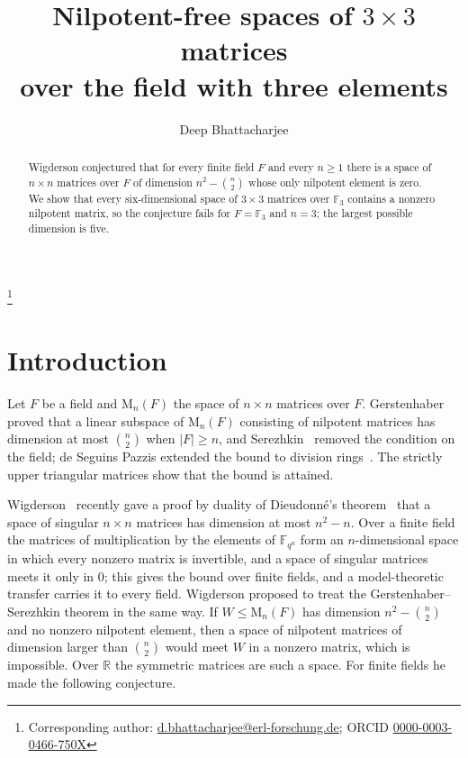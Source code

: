 \documentclass[11pt]{amsart}
\theoremstyle{definition}
\theoremstyle{remark}
\numberwithin{equation}{section}
\newcommand{\F}{\mathbb{F}}
\newcommand{\M}{\mathrm{M}}
\begin{document}
\title[Nilpotent-free spaces of $3\times3$ matrices over $\F_3$]{Nilpotent-free spaces of $3\times 3$ matrices\\ over the field with three elements}

\author{Deep Bhattacharjee}
\address{Formerly, Electro-Gravitational Space Propulsion Laboratory (EGSPL),\newline Bhubaneswar, Odisha 751030, India}
\thanks{Corresponding author: \href{mailto:d.bhattacharjee@erl-forschung.de}{d.bhattacharjee@erl-forschung.de}; ORCID \href{https://orcid.org/0000-0003-0466-750X}{\mbox{0000-0003-0466-750X}}}


\begin{abstract}
Wigderson conjectured that for every finite field $F$ and every $n\ge1$ there is a space of $n\times n$ matrices over $F$ of dimension $n^2-\binom n2$ whose only nilpotent element is zero. We show that every six-dimensional space of $3\times3$ matrices over $\F_3$ contains a nonzero nilpotent matrix, so the conjecture fails for $F=\F_3$ and $n=3$; the largest possible dimension is five.
\end{abstract}

\maketitle

\section{Introduction}

Let $F$ be a field and $\M_n(F)$ the space of $n\times n$ matrices over $F$. Gerstenhaber~\cite{Ge} proved that a linear subspace of $\M_n(F)$ consisting of nilpotent matrices has dimension at most $\binom n2$ when $|F|\ge n$, and Serezhkin~\cite{Se} removed the condition on the field; de Seguins Pazzis extended the bound to division rings~\cite{dSP}. The strictly upper triangular matrices show that the bound is attained.

Wigderson~\cite{Wi} recently gave a proof by duality of Dieudonn\'e's theorem~\cite{Di,Me} that a space of singular $n\times n$ matrices has dimension at most $n^2-n$. Over a finite field the matrices of multiplication by the elements of $\F_{q^n}$ form an $n$-dimensional space in which every nonzero matrix is invertible, and a space of singular matrices meets it only in $0$; this gives the bound over finite fields, and a model-theoretic transfer carries it to every field. Wigderson proposed to treat the Gerstenhaber--Serezhkin theorem in the same way. If $W\le\M_n(F)$ has dimension $n^2-\binom n2$ and no nonzero nilpotent element, then a space of nilpotent matrices of dimension larger than $\binom n2$ would meet $W$ in a nonzero matrix, which is impossible. Over $\mathbb R$ the symmetric matrices are such a space. For finite fields he made the following conjecture.
\end{document}
